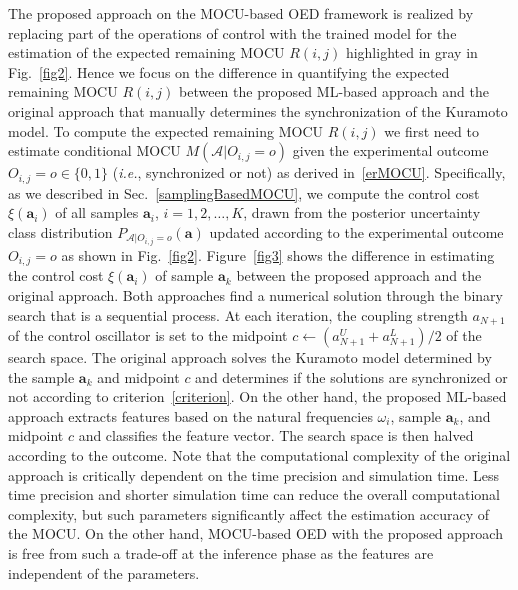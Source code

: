 \documentclass{article}
\begin{document}
The proposed approach on the MOCU-based OED framework is realized by replacing part of the operations of control with the trained model for the estimation of the expected remaining MOCU ${R\left(i, j\right)}$ highlighted in gray in Fig.~\ref{fig2}. Hence we focus on the difference in quantifying the expected remaining MOCU ${R\left(i, j\right)}$ between the proposed ML-based approach and the original approach that manually determines the synchronization of the Kuramoto model. To compute the expected remaining MOCU ${R\left(i, j\right)}$ we first need to estimate conditional MOCU ${M\left(\mathbf{\mathcal{A}} | O_{i, j} = o \right)}$ given the experimental outcome ${O_{i, j} = o \in \{0, 1\}}$ (\textit{i.e.}, synchronized or not) as derived in~\eqref{erMOCU}. Specifically, as we described in Sec.~\ref{samplingBasedMOCU}, we compute the control cost ${\xi\left(\mathbf{a}_i\right)}$ of all samples ${\mathbf{a}_i}$, ${i = 1, 2, \dots, K}$, drawn from the posterior uncertainty class distribution ${P_{\mathbf{\mathcal{A}}| O_{i, j} = o} \left( \mathbf{a} \right)}$ updated according to the experimental outcome ${O_{i, j} = o}$ as shown in Fig.~\ref{fig2}. Figure~\ref{fig3} shows the difference in estimating the control cost ${\xi\left(\mathbf{a}_i\right)}$ of sample ${\mathbf{a}_k}$ between the proposed approach and the original approach. Both approaches find a numerical solution through the binary search that is a sequential process. At each iteration, the coupling strength ${a_{N+1}}$ of the control oscillator is set to the midpoint ${c\leftarrow\left({a^U_{N+1}}+{a^L_{N+1}}\right)/2}$ of the search space. The original approach solves the Kuramoto model determined by the sample ${\mathbf{a}_k}$ and midpoint ${c}$ and determines if the solutions are synchronized or not according to criterion~\eqref{criterion}. On the other hand, the proposed ML-based approach extracts features based on the natural frequencies ${\omega_i}$, sample ${\mathbf{a}_k}$, and midpoint ${c}$ and classifies the feature vector. The search space is then halved according to the outcome. Note that the computational complexity of the original approach is critically dependent on the time precision and simulation time. Less time precision and shorter simulation time can reduce the overall computational complexity, but such parameters significantly affect the estimation accuracy of the MOCU. On the other hand, MOCU-based OED with the proposed approach is free from such a trade-off at the inference phase as the features are independent of the parameters. 
\end{document}
